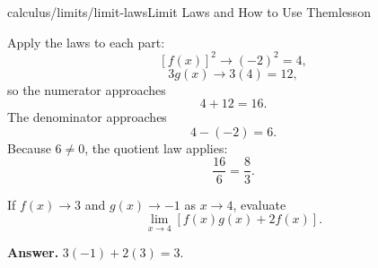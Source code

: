 \begin{webpage}{calculus/limits/limit-laws}{Limit Laws and How to Use Them}{lesson}
\begin{bgexample}[title={Several laws at once}]
\begin{bgsolution}
Apply the laws to each part:
\[
  [f(x)]^2\to(-2)^2=4,
\]
\[
  3g(x)\to3(4)=12,
\]
so the numerator approaches
\[
  4+12=16.
\]
The denominator approaches
\[
  4-(-2)=6.
\]
Because \(6\ne0\), the quotient law applies:
\[
  \boxed{\frac{16}{6}=\frac83}.
\]
\end{bgsolution}
\end{bgexample}

\begin{bgquickcheck}
If \(f(x)\to3\) and \(g(x)\to-1\) as \(x\to4\), evaluate
\[
  \lim_{x\to4}[f(x)g(x)+2f(x)].
\]

\textbf{Answer.} \(3(-1)+2(3)=3\).
\end{bgquickcheck}
\end{webpage}

